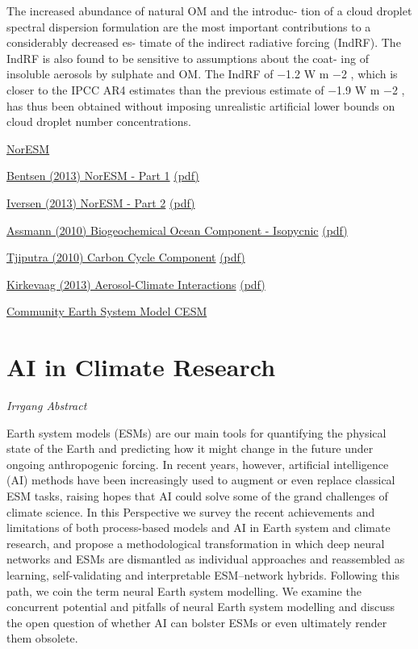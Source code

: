 \documentclass[
]{book}
\begin{document}
The increased abundance of natural OM and the introduc-
tion of a cloud droplet spectral dispersion formulation are the
most important contributions to a considerably decreased es-
timate of the indirect radiative forcing (IndRF). The IndRF
is also found to be sensitive to assumptions about the coat-
ing of insoluble aerosols by sulphate and OM. The IndRF of
−1.2 W m −2 , which is closer to the IPCC AR4 estimates than
the previous estimate of −1.9 W m −2 , has thus been obtained
without imposing unrealistic artificial lower bounds on cloud
droplet number concentrations.

\href{https://www.noresm.org/}{NorESM}

\href{https://gmd.copernicus.org/articles/6/687/2013/}{Bentsen (2013) NorESM - Part 1}
\href{pdf/Bentsen_2013_NorESM_1.pdf}{(pdf)}

\href{https://gmd.copernicus.org/articles/6/389/2013/}{Iversen (2013) NorESM - Part 2}
\href{pdf/Iversen_2013_NorESM_2.pdf}{(pdf)}

\href{https://gmd.copernicus.org/articles/3/143/2010/}{Assmann (2010) Biogeochemical Ocean Component - Isopycnic}
\href{pdf/Assmann_2010_Isopycnic_Ocean_Carbon_Cycle_Model.pdf}{(pdf)}

\href{https://gmd.copernicus.org/articles/3/123/2010/}{Tjiputra (2010) Carbon Cycle Component}
\href{pdf/Tjiputra_2010_Climate_Cycle_Feedbacks.pdf}{(pdf)}

\href{https://gmd.copernicus.org/articles/6/207/2013/}{Kirkevaag (2013) Aerosol-Climate Interactions}
\href{pdf/Kirkevaag_2013_Aerosol_NorESM.pdf}{(pdf)}

\href{https://www.cesm.ucar.edu/}{Community Earth System Model CESM}

\hypertarget{ai-in-climate-research}{%
\chapter{AI in Climate Research}\label{ai-in-climate-research}}

\emph{Irrgang Abstract}

Earth system models (ESMs) are our main tools for quantifying the physical state of the Earth and predicting how it might change in the future under ongoing anthropogenic forcing. In recent years, however, artificial intelligence (AI) methods have been increasingly used to augment or even replace classical ESM tasks, raising hopes that AI could solve some of the grand challenges of climate science. In this Perspective we survey the recent achievements and limitations of both process-based models and AI in Earth system and climate research, and propose a methodological transformation in which deep neural networks and ESMs are dismantled as individual approaches and reassembled as learning, self-validating and interpretable ESM--network hybrids. Following this path, we coin the term neural Earth system modelling. We examine the concurrent potential and pitfalls of neural Earth system modelling and discuss the open question of whether AI can bolster ESMs or even ultimately render them obsolete.
\end{document}
